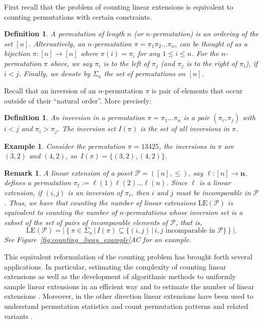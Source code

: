 \documentclass[9pt,a4paper,oneside]{article}
\newtheorem{example}[theorem]{Example}
\newtheorem{remark}[theorem]{Remark}
\newtheorem{definition}[theorem]{Definition}
\newcommand{\cP}{\mathcal{P}}
\newcommand{\bn}{\mathbf{n}}
\newcommand{\lex}{\mathrm{LE}}
\begin{document}
First recall that the problem of counting linear extensions is equivalent to counting permutations with certain constraints.

\begin{definition}
A permutation of length $n$ (or $n$-permutation) is an ordering of the set $[n]$.
Alternatively, an $n$-permutation $\pi=\pi_1\pi_2\ldots \pi_n$, can be thought of as a bijection $\pi:[n]\to[n]$ where $\pi(i)=\pi_i$ for any $1\leq i \leq n$.
For the $n$-permutation $\pi$ above, we say $\pi_i$ is to the left of $\pi_j$ (and $\pi_j$ is to the right of $\pi_i$),  if $i<j$.
Finally, we denote by $\Sigma_n$ the set of permutations on $[n]$.
\end{definition}

Recall that an inversion of an $n$-permutation $\pi$ is  pair of elements that occur outside of their ``natural order''.  More precisely:
  
\begin{definition}
  An \emph{inversion} in a permutation $\pi=\pi_1\dots\pi_n$ is a pair $(\pi_i,\pi_j)$ with $i<j$ and $\pi_i>\pi_j$.
  The \emph{inversion set} $I(\pi)$ is the set of all inversions in $\pi$.
 \end{definition}
 \begin{example}
  Consider the permutation $\pi=13425$, the inversions in $\pi$ are $(3,2)$ and $(4,2)$, so~$I(\pi)=\{(3,2),(4,2)\}$.
 \end{example}

\begin{remark}
A linear extension of a poset $\cP=([n], \leq)$, say $\ell:[n]\to \bn$, defines a permutation $\pi_\ell := \ell(1)\ell(2)\ldots \ell(n)$. Since $\ell$ is a linear extension, if $(i,j)$ is an inversion of $\pi_\ell$, then $i$ and $j$ must be incomparable in $\cP$.  Thus, we have that counting the number of linear extensions $\lex(\cP)$ is equivalent to counting the number of $n$-permutations whose inversion set is a subset of the set of pairs of incomparable elements of $\cP$,  that is, 
\[\lex(\cP) = |\left\{\pi\in\Sigma_n\,|\,I(\pi)\subseteq \{(i,j)\,|\, i, j \text{ incomparable in } \cP\}\right\}|.\]
See Figure~\ref{fig:counting_3way_example}AC for an example.
\end{remark}

This equivalent reformulation of the counting problem has brought forth several applications.  In particular, estimating the complexity of counting linear extensions \cite{BW91, dittmer2018counting} as well as the development of algorithmic methods to uniformly sample linear extensions in an efficient way \cite{PR94,huber2025generating} and to estimate the number of linear extensions \cite{banks2010using}. Moreover, in the other direction linear extensions have been used to understand permutation statistics \cite{BjWa91} and count permutation patterns and related variants \cite{EN12,yakoubov2015pattern,cooper2016complexity}.
\end{document}
